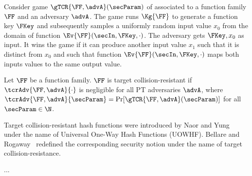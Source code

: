 Consider game $\gTCR{\FF,\advA}(\secParam)$ of  associated to a function family $\FF$ and an adversary $\advA$.
The game runs $\Kg{\FF}$ to generate a function key $\FKey$ and subsequently samples a uniformly random input value $x_0$ from the domain of function $\Ev{\FF}(\secIn, \FKey, \cdot)$.
The adversary gets $\FKey,x_0$ as input.
It wins the game if it can produce another input value $x_1$ such that it is distinct from $x_0$ and such that function $\Ev{\FF}(\secIn, \FKey, \cdot)$ maps both inputs values to the same output value.
\begin{defn}
  Let $\FF$ be a function family.
  $\FF$ is target collision-resistant if $\tcrAdv{\FF,\advA}{\cdot}$ is negligible for all PT adversaries $\advA$,
  where $\tcrAdv{\FF,\advA}{\secParam}=\Pr[\gTCR{\FF,\advA}(\secParam)]$ for all $\secParam\in\N$.
\end{defn}
Target collision-resistant hash functions were introduced by Naor and Yung~\cite{STOC:NaoYun89} under the name of Universal One-Way Hash Functions (UOWHF).
Bellare and Rogaway~\cite{C:BelRog97} redefined the corresponding security notion under the name of target collision-resistance.

...
